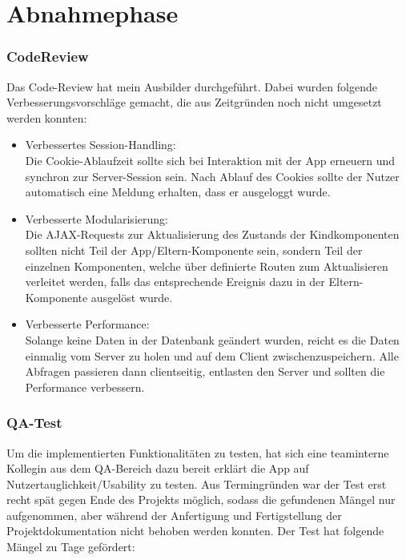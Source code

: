 \section{Abnahmephase} 
\label{sec:Abnahmephase}

\subsubsection{CodeReview}
Das Code-Review hat mein Ausbilder durchgeführt. Dabei wurden folgende Verbesserungsvorschläge gemacht, die aus Zeitgründen noch nicht umgesetzt werden konnten:

\begin{itemize}
\item Verbessertes Session-Handling:\\
Die Cookie-Ablaufzeit sollte sich bei Interaktion mit der App erneuern und synchron zur Server-Session sein. Nach Ablauf des Cookies sollte der Nutzer automatisch eine Meldung erhalten, dass er ausgeloggt wurde.
\item Verbesserte Modularisierung:\\
Die AJAX-Requests zur Aktualisierung des Zustands der Kindkomponenten sollten nicht Teil der App/Eltern-Komponente sein, sondern Teil der einzelnen Komponenten, welche über definierte Routen zum Aktualisieren verleitet werden, falls das entsprechende Ereignis dazu in der Eltern-Komponente ausgelöst wurde.
\item Verbesserte Performance:\\
Solange keine Daten in der Datenbank geändert wurden, reicht es die Daten einmalig vom Server zu holen und auf dem Client zwischenzuspeichern. Alle Abfragen passieren dann clientseitig, entlasten den Server und sollten die Performance verbessern.

\end{itemize}

\subsubsection{QA-Test}

Um die implementierten Funktionalitäten zu testen, hat sich eine teaminterne Kollegin aus dem QA-Bereich dazu bereit erklärt die App auf Nutzertauglichkeit/Usability zu testen. Aus Termingründen war der Test erst recht spät gegen Ende des Projekts möglich, sodass die gefundenen Mängel nur aufgenommen, aber während der Anfertigung und Fertigstellung der Projektdokumentation nicht behoben werden konnten. Der Test hat folgende Mängel zu Tage gefördert:

